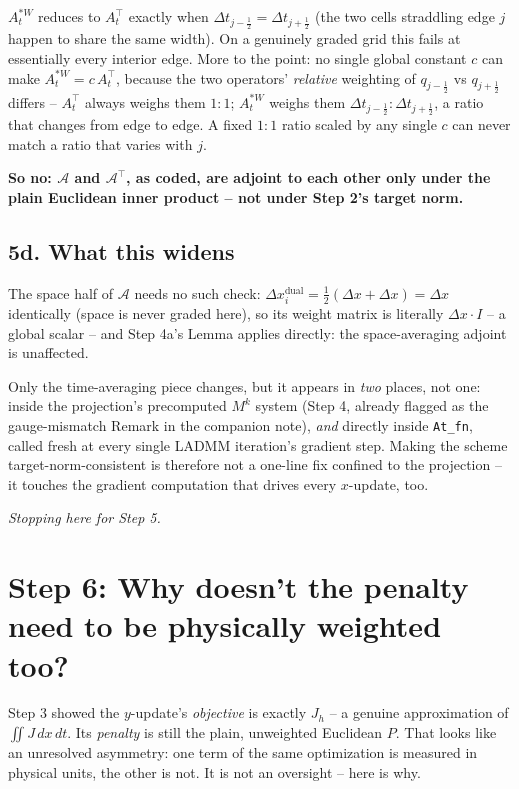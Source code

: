 \documentclass[11pt]{article}
\newcommand{\dt}{\Delta t}
\newcommand{\dx}{\Delta x}
\newcommand{\code}[1]{\texttt{#1}}
\newcommand{\half}{\tfrac12}
\begin{document}
$A_t^{*W}$ reduces to $A_t^\top$ exactly when $\dt_{j-\half}=\dt_{j+\half}$ (the two cells
straddling edge $j$ happen to share the same width). On a genuinely graded grid this fails at
essentially every interior edge. More to the point: no single global constant $c$ can make
$A_t^{*W}=c\,A_t^\top$, because the two operators' \emph{relative} weighting of $q_{j-\half}$ vs
$q_{j+\half}$ differs -- $A_t^\top$ always weighs them $1:1$; $A_t^{*W}$ weighs them
$\dt_{j-\half}:\dt_{j+\half}$, a ratio that changes from edge to edge. A fixed $1:1$ ratio scaled
by any single $c$ can never match a ratio that varies with $j$.

\textbf{So no: $\mathcal{A}$ and $\mathcal{A}^\top$, as coded, are adjoint to each other only under
the plain Euclidean inner product -- not under Step 2's target norm.}

\subsection*{5d. What this widens}

The space half of $\mathcal{A}$ needs no such check: $\dx_i^\mathrm{dual}=\half(\dx+\dx)=\dx$
identically (space is never graded here), so its weight matrix is literally $\dx\cdot I$ -- a
global scalar -- and Step 4a's Lemma applies directly: the space-averaging adjoint is unaffected.

Only the time-averaging piece changes, but it appears in \emph{two} places, not one: inside the
projection's precomputed $M^k$ system (Step 4, already flagged as the gauge-mismatch Remark in the
companion note), \emph{and} directly inside \code{At\_fn}, called fresh at every single LADMM
iteration's gradient step. Making the scheme target-norm-consistent is therefore not a
one-line fix confined to the projection -- it touches the gradient computation that drives every
$x$-update, too.

\bigskip
\noindent\emph{Stopping here for Step 5.}

\section*{Step 6: Why doesn't the penalty need to be physically weighted too?}

Step 3 showed the $y$-update's \emph{objective} is exactly $J_h$ -- a genuine approximation of
$\iint J\,dx\,dt$. Its \emph{penalty} is still the plain, unweighted Euclidean $P$. That looks like
an unresolved asymmetry: one term of the same optimization is measured in physical units, the
other is not. It is not an oversight -- here is why.
\end{document}
